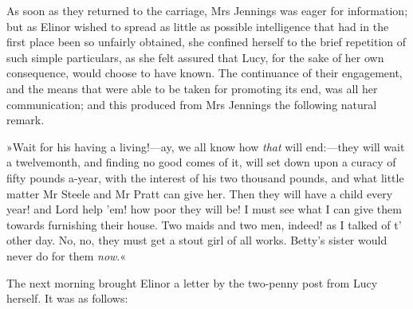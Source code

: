 As soon as they returned to the carriage, Mrs Jennings was eager for information; but as Elinor wished to spread as little as possible intelligence that had in the first place been so unfairly obtained, she confined herself to the brief repetition of such simple particulars, as she felt assured that Lucy, for the sake of her own consequence, would choose to have known. The continuance of their engagement, and the means that were able to be taken for promoting its end, was all her communication; and this produced from Mrs Jennings the following natural remark.

»Wait for his having a living!—ay, we all know how \textit{that} will end:—they will wait a twelvemonth, and finding no good comes of it, will set down upon a curacy of fifty pounds a-year, with the interest of his two thousand pounds, and what little matter Mr Steele and Mr Pratt can give her. Then they will have a child every year! and Lord help ’em! how poor they will be! I must see what I can give them towards furnishing their house. Two maids and two men, indeed! as I talked of t’ other day. No, no, they must get a stout girl of all works. Betty’s sister would never do for them \textit{now}.«

The next morning brought Elinor a letter by the two-penny post from Lucy herself. It was as follows:

